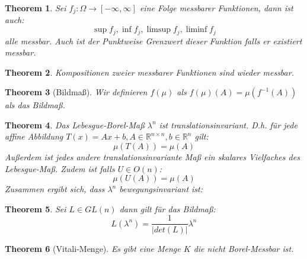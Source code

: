 \documentclass[10pt,a4paper]{article}
\newtheorem{theorem}{Theorem}
\begin{document}
\begin{theorem}
	Sei $f_j:\Omega \to [-\infty, \infty]$ eine Folge messbarer Funktionen, dann ist auch:
	$$\sup f_j, \inf f_j, \limsup f_j, \liminf f_j$$
	alle messbar. Auch ist der Punktweise Grenzwert dieser Funktion falls er existiert messbar.
\end{theorem}
\begin{theorem}
	Kompositionen zweier messbarer Funktionen sind wieder messbar.
\end{theorem}
\begin{theorem}[Bildmaß]
	Wir definieren $f(\mu)$ als $f(\mu)(A) = \mu(f^{-1}(A))$ als das Bildmaß.
\end{theorem}
\begin{theorem}
	Das Lebesgue-Borel-Maß $\lambda^n$ ist translationsinvariant. D.h. für jede affine Abbildung $T(x) = Ax+b, A\in \mathbb{R}^{n\times n}, b\in \mathbb{R}^n$ gilt: $$\mu(T(A)) = \mu(A)$$
	Außerdem ist jedes andere translationsinvariante Maß ein skalares Vielfaches des Lebesgue-Maß.
	Zudem ist falls $U \in O(n)$: 
	$$\mu(U(A)) = \mu(A)$$
	Zusammen ergibt sich, dass $\lambda^n$ bewegungsinvariant ist:
\end{theorem}
\begin{theorem}
	Sei $L \in GL(n)$ dann gilt für das Bildmaß:
	$$L(\lambda^n) = \frac{1}{|det(L)|} \lambda^n$$
\end{theorem}
\begin{theorem}[Vitali-Menge]
	Es gibt eine Menge $K$ die nicht Borel-Messbar ist.
\end{theorem}
\end{document}
